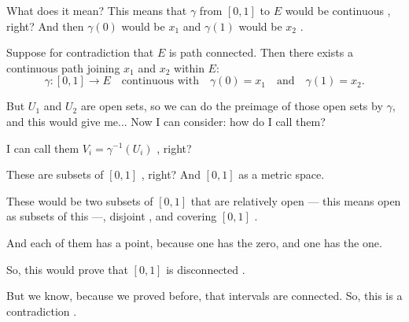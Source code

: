 \begin{proofWrapper}
\begin{speech}[00:40:24 - 00:41:35]
What does it mean? This means that $\gamma$ from $[0, 1]$ to $E$  would be continuous , right? And then $\gamma(0)$ would be $x_1$ and $\gamma(1)$ would be $x_2$ .
\end{speech}

\begin{content}
Suppose for contradiction that $E$ is path connected.
Then there exists a continuous path joining $x_1$ and $x_2$ within $E$:
\begin{equation}\label{eq:connecting-path-gamma}
\gamma \colon [0, 1] \to E \quad \text{continuous with} \quad \gamma(0) = x_1 \quad \text{and} \quad \gamma(1) = x_2.
\end{equation}
\end{content}

\begin{speech}[00:41:35 - 00:43:15]
But $U_1$ and $U_2$ are open sets, so we can do the preimage of those open sets by $\gamma$, and this would give me... Now I can consider: how do I call them?

I can call them $V_i = \gamma^{-1}(U_i)$ , right?

These are subsets of $[0, 1]$ , right? And $[0, 1]$ as a metric space.

These would be two subsets of $[0, 1]$ that are relatively open --- this means open as subsets of this  ---, disjoint , and covering $[0, 1]$ .

And each of them has a point, because one has the zero, and one has the one.

So, this would prove  that $[0, 1]$ is disconnected .

But we know, because we proved before, that intervals are connected. So, this is a contradiction .
\end{speech}


\end{proofWrapper}
